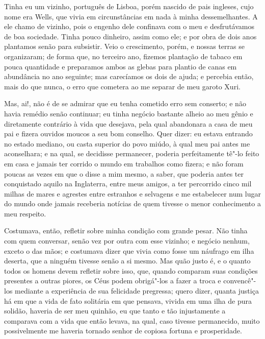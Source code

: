 Tinha eu um vizinho, português de Lisboa, porém nascido de pais
ingleses, cujo nome era Wells, que vivia em circunstâncias em nada à
minha dessemelhantes. A ele chamo de vizinho, pois o engenho dele
confinava com o meu e desfrutávamos de boa sociedade. Tinha pouco
dinheiro, assim como ele; e por obra de dois anos plantamos senão para
subsistir. Veio o crescimento, porém, e nossas terras se organizaram; de
forma que, no terceiro ano, fizemos plantação de tabaco em pouca
quantidade e preparamos ambos as glebas para plantio de canas em
abundância no ano seguinte; mas carecíamos os dois de ajuda; e percebia
então, mais do que nunca, o erro que cometera ao me separar de meu
garoto Xuri.

Mas, ai!, não é de se admirar que eu tenha cometido erro sem conserto; e
não havia remédio senão continuar; eu tinha negócio bastante alheio ao
meu gênio e diretamente contrário à vida que desejava, pela qual
abandonara a casa de meu pai e fizera ouvidos moucos a seu bom conselho.
Quer dizer: eu estava entrando no estado mediano, ou casta superior do
povo miúdo, à qual meu pai antes me aconselhara; e na qual, se decidisse
permanecer, poderia perfeitamente tê"-lo feito em casa e jamais ter
corrido o mundo em trabalhos como fizera; e não foram poucas as vezes em
que o disse a mim mesmo, a saber, que poderia antes ter conquistado
aquilo na Inglaterra, entre meus amigos, a ter percorrido cinco mil
milhas de mares e agrestes entre estranhos e selvagens e me estabelecer
num lugar do mundo onde jamais receberia notícias de quem tivesse o
menor conhecimento a meu respeito.

Costumava, então, refletir sobre minha condição com grande pesar. Não
tinha com quem conversar, senão vez por outra com esse vizinho; e
negócio nenhum, exceto o das mãos; e costumava dizer que vivia como
fosse um náufrago em ilha deserta, que a ninguém tivesse senão a si
mesmo. Mas quão justo é, e o quanto todos os homens devem refletir sobre
isso, que, quando comparam suas condições presentes a outras piores, os
Céus podem obrigá"-los a fazer a troca e convencê"-los mediante a
experiência de sua felicidade pregressa; quero dizer, quanta justiça há
em que a vida de fato solitária em que pensava, vivida em uma ilha de
pura solidão, haveria de ser meu quinhão, eu que tanto e tão
injustamente a comparava com a vida que então levava, na qual, caso
tivesse permanecido, muito possivelmente me haveria tornado senhor de
copiosa fortuna e prosperidade.

